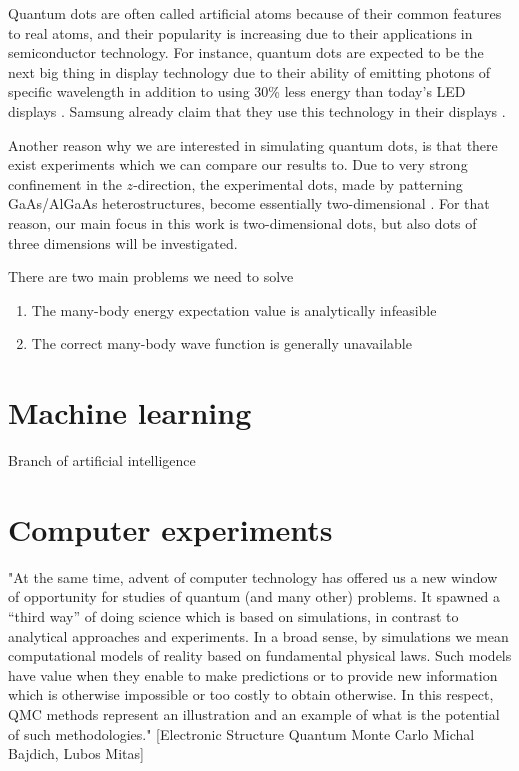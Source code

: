 Quantum dots are often called artificial atoms because of their common features to real atoms, and their popularity is increasing due to their applications in semiconductor technology. For instance, quantum dots are expected to be the next big thing in display technology due to their ability of emitting photons of specific wavelength in addition to using 30\% less energy than today's LED displays \cite{manders_8.3:_2015}. Samsung already claim that they use this technology in their displays \cite{noauthor_2019_nodate}.

Another reason why we are interested in simulating quantum dots, is that there exist experiments which we can compare our results to. Due to very strong confinement in the $z$-direction, the experimental dots, made by patterning GaAs/AlGaAs heterostructures, become essentially two-dimensional \cite{marzin_photoluminescence_1994,brunner_sharp-line_1994}. For that reason, our main focus in this work is two-dimensional dots, but also dots of three dimensions will be investigated.

There are two main problems we need to solve
\begin{enumerate}
	\item The many-body energy expectation value is analytically infeasible
	\item The correct many-body wave function is generally unavailable
\end{enumerate}

\section{Machine learning} \label{subsec:machinelearning}
Branch of artificial intelligence

\section{Computer experiments}
"At the same time, advent of computer technology has
offered us a new window of opportunity for studies of quantum (and many other) problems. It
spawned a “third way” of doing science which is based on simulations, in contrast to analytical
approaches and experiments. In a broad sense, by simulations we mean computational models of
reality based on fundamental physical laws. Such models have value when they enable to make
predictions or to provide new information which is otherwise impossible or too costly to obtain
otherwise. In this respect, QMC methods represent an illustration and an example of what is the
potential of such methodologies." [Electronic Structure Quantum Monte Carlo Michal Bajdich, Lubos Mitas]  

